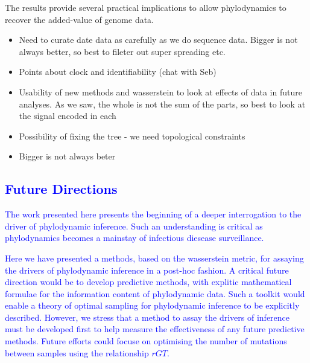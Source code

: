 \documentclass{article}
\begin{document}
The results provide several practical implications to allow phylodynamics to recover the added-value of genome data. 
    \begin{itemize}
        \item Need to curate date data as carefully as we do sequence data. Bigger is not always better, so best to fileter out super spreading etc.
        \item Points about clock and identifiability (chat with Seb)
        \item Usability of new methods and wasserstein to look at effects of data in future analyses. As we saw, the whole is not the sum of the parts, so best to look at the signal encoded in each
        \item Possibility of fixing the tree - we need topological constraints
        \item Bigger is not always beter
    \end{itemize}
    
    
\textcolor{blue}{\subsection{Future Directions}
The work presented here presents the beginning of a deeper interrogation to the driver of phylodynamic inference. Such an understanding is critical as phylodynamics becomes a mainstay of infectious diesease surveillance.}

\textcolor{blue}{Here we have presented a methods, based on the wasserstein metric, for assaying the drivers of phylodynamic inference in a post-hoc fashion. A critical future direction would be to develop predictive methods, with explitic mathematical formulae for the information content of phylodynamic data. Such a toolkit would enable a theory of optimal sampling for phylodynamic inference to be explicitly described. However, we stress that a method to assay the drivers of inference must be developed first to help measure the effectiveness of any future predictive methods. Future efforts could focuse on optimising the number of mutations between samples using the relationship $rGT$.}


\end{document}
